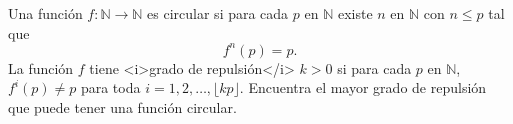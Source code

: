 Una función $f:\mathbb N\to\mathbb N$ es circular si para cada $p$ en $\mathbb N$ existe $n$ en $\mathbb N$ con $n\leq p$ tal que \[f^n(p)=p.\] La función $f$ tiene <i>grado de repulsión</i> $k\gt 0$ si para cada $p$ en $\mathbb N$, $f^i(p)\neq p$ para toda $i=1,2,\dots,\lfloor kp\rfloor$. Encuentra el mayor grado de repulsión que puede tener una función circular.